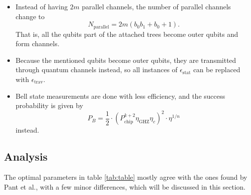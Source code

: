 \documentclass[%
 reprint,
 amsmath,amssymb
 aps,
]{revtex4}
\theoremstyle{remark}
\begin{document}
\begin{itemize}
    \item Instead of having $2m$ parallel channels, the number of parallel channels change to 
    \begin{equation}
        N_\text{parallel} = 2m(b_0b_1+b_0+1).
    \end{equation}
    That is, all the qubits part of the attached trees become outer qubits and form channels.
    \item Because the mentioned qubits become outer qubits, they are transmitted through quantum channels instead, so all instances of $\epsilon_\text{stat}$ can be replaced with $\epsilon_\text{trav}.$
    \item Bell state measurements are done with less efficiency, and the success probability is given by 
    \begin{equation}
        P_B = \frac{1}{2} \cdot \left(P^{k+2}_\text{chip}\eta_\text{GHZ}\eta_c\right)^2 \cdot \eta^{1/n}
    \end{equation}
    instead.
\end{itemize}
\subsection{Analysis}
The optimal parameters in table \ref{tab:table} mostly agree with the ones found by Pant et al., with a few minor differences, which will be discussed in this section.
% 
\end{document}
